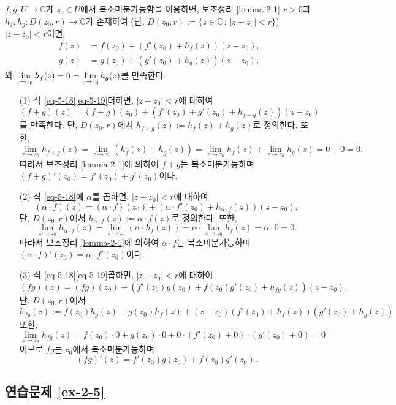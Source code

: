 $f,g:U\to \mathbb C$가 $z_0\in U$에서 복소미분가능함을 이용하면,
보조정리 \ref{lemma-2-1}
$r>0$과 $h_f, h_g: D(z_0,r) \to \mathbb C$가 존재하여
(단, $D(z_0,r):= \{ z\in \mathbb C \,:\, |z-z_0| < r\}$)
$|z-z_0|<r$이면,
\begin{align}
f(z) & = f(z_0) + (f'(z_0) +h_f(z))(z-z_0), \label{eq-5-18} \\
g(z) & = g(z_0) + (g'(z_0) +h_g(z))(z-z_0), \label{eq-5-19}
\end{align}
와 $\lim\limits_{z\to z_0} h_f(z)  = 0 = \lim\limits_{z\to z_0} h_g(z)$를 만족한다.
\begin{itemize}
\item[(1)] 식 \eqref{eq-5-18}\과 \eqref{eq-5-19}\를 더하면,
$|z-z_0|<r$에 대하여
\[
(f+g)(z) = (f+g)(z_0) + \left( f'(z_0) + g'(z_0) + h_{f+g}(z) \right)(z-z_0)
\]
를 만족한다. 단, $D(z_0,r)$에서 $h_{f+g} (z) := h_f(z) + h_g(z)$로 정의한다.
또한,
\[
\lim_{z\to z_0} h_{f+g}(z) = \lim_{z\to z_0} ( h_f(z) + h_g(z) )
= \lim_{z\to z_0} h_f(z) + \lim_{z\to z_0} h_g(z) = 0+0 = 0.
\]
따라서
보조정리 \ref{lemma-2-1}에 의하여
$f+g$는 복소미분가능하며 $(f+g)'(z_0) = f'(z_0) + g'(z_0)$이다.
\item[(2)] 식 \eqref{eq-5-18}에 $\alpha$를 곱하면,
$|z-z_0|<r$에 대하여
\[
(\alpha \cdot f)(z) = (\alpha \cdot f)(z_0) + \left(
\alpha\cdot f'(z_0) + h_{\alpha\cdot f}(z) \right) (z-z_0),
\]
단, $D(z_0,r)$에서 $h_{\alpha\cdot f}(z) := \alpha \cdot f(z)$로 정의한다.
또한,
\[
\lim_{z\to z_0} h_{\alpha\cdot f}(z) = \lim_{z\to z_0} (\alpha\cdot h_f(z))
= \alpha \cdot \lim_{z\to z_0} h_f(z) = \alpha\cdot 0 = 0.
\]
따라서
보조정리 \ref{lemma-2-1}에 의하여
$\alpha \cdot f$는 복소미분가능하며 $(\alpha\cdot f)'(z_0) =\alpha\cdot f'(z_0)$이다.

\item[(3)] 식 \eqref{eq-5-18}\과 \eqref{eq-5-19}\를 곱하면,
$|z-z_0|<r$에 대하여
\[
(fg)(z) = (fg)(z_0) + \left( f'(z_0)g(z_0) + f(z_0)g'(z_0) + h_{fg}(z) \right) (z-z_0),
\]
단, $D(z_0,r)$에서
\[
h_{fg}(z):= f(z_0)h_g(z) + g(z_0)h_f(z) + (z-z_0)(f'(z_0)+h_f(z))(g'(z_0)+h_g(z))
\]
또한,
\[
\lim_{z\to z_0} h_{fg}(z) = f(z_0)\cdot0 + g(z_0)\cdot 0 
+ 0\cdot (f'(z_0)+0)\cdot(g'(z_0)+0)=0
\]
이므로 $fg$는 $z_0$에서 복소미분가능하며
\[
(fg)'(z) = f'(z_0)g(z_0) + f(z_0)g'(z_0).
\]
\end{itemize}

\subsection*{연습문제 \ref{ex-2-5}}

